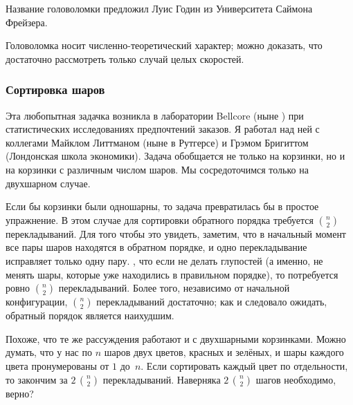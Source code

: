 \documentclass[twoside]{book}
\begin{document}

Название головоломки предложил Луис Годин из Университета Саймона Фрейзера.

Головоломка носит численно-теоретический характер;
можно доказать, что достаточно рассмотреть только случай целых скоростей.

\subsubsection*{Сортировка шаров}

Эта любопытная задачка возникла в лаборатории Bellcore (ныне ) при статистических исследованиях предпочтений заказов.
Я работал над ней с коллегами Майклом Литтманом (ныне в Рутгерсе) и Грэмом Бригиттом (Лондонская школа экономики).
Задача обобщается не только на  корзинки, но и на корзинки с различным числом шаров.
Мы сосредоточимся только на двухшарном случае.

\medskip

Если бы корзинки были одношарны, то задача превратилась бы в простое упражнение.
В этом случае для сортировки обратного порядка требуется $\binom{n}{2}$ перекладываний.
Для того чтобы это увидеть, заметим, что в начальный момент все пары шаров находятся в обратном порядке, и одно перекладывание исправляет только одну пару.
, что если не делать глупостей (а именно, не менять шары, которые уже находились в правильном порядке), то потребуется ровно $\binom{n}{2}$ перекладываний.
Более того, независимо от начальной конфигурации, $\binom{n}{2}$ перекладываний достаточно; как и следовало ожидать, обратный порядок является наихудшим.


Похоже, что те же рассуждения работают и с двухшарными корзинками.
Можно думать, что у нас по $n$ шаров двух цветов, красных и зелёных, и шары каждого цвета пронумерованы от $1$ до~$n$.
Если сортировать каждый цвет по отдельности, то закончим за $2\,\binom{n}{2}$ перекладываний.
Наверняка $2\,\binom{n}{2}$ шагов необходимо, верно?
\end{document}
